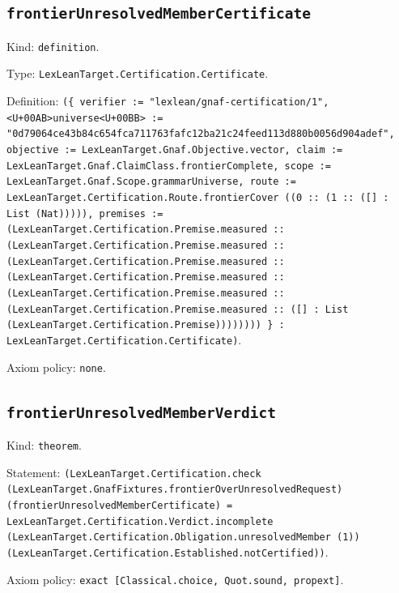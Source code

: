 \documentclass[11pt]{article}
\begin{document}
\subsection*{\texttt{frontierUnresolvedMemberCertificate}}
\noindent Kind: \texttt{definition}.\par
\noindent Type: \texttt{LexLeanTarget.Certification.Certificate}.\par
\noindent Definition: \texttt{(\{ verifier := "lexlean/gnaf-certification/1", <U+00AB>universe<U+00BB> := "0d79064ce43b84c654fca711763fafc12ba21c24feed113d880b0056d904adef", objective := LexLeanTarget.Gnaf.Objective.vector, claim := LexLeanTarget.Gnaf.ClaimClass.frontierComplete, scope := LexLeanTarget.Gnaf.Scope.grammarUniverse, route := LexLeanTarget.Certification.Route.frontierCover ((0 :: (1 :: ([] : List (Nat))))), premises := (LexLeanTarget.Certification.Premise.measured :: (LexLeanTarget.Certification.Premise.measured :: (LexLeanTarget.Certification.Premise.measured :: (LexLeanTarget.Certification.Premise.measured :: (LexLeanTarget.Certification.Premise.measured :: (LexLeanTarget.Certification.Premise.measured :: ([] : List (LexLeanTarget.Certification.Premise)))))))) \} : LexLeanTarget.Certification.Certificate)}.\par
\noindent Axiom policy: \texttt{none}.\par
\subsection*{\texttt{frontierUnresolvedMemberVerdict}}
\noindent Kind: \texttt{theorem}.\par
\noindent Statement: \texttt{(LexLeanTarget.Certification.check (LexLeanTarget.GnafFixtures.frontierOverUnresolvedRequest) (frontierUnresolvedMemberCertificate) = LexLeanTarget.Certification.Verdict.incomplete (LexLeanTarget.Certification.Obligation.unresolvedMember (1)) (LexLeanTarget.Certification.Established.notCertified))}.\par
\noindent Axiom policy: \texttt{exact [Classical.choice, Quot.sound, propext]}.\par
\end{document}
